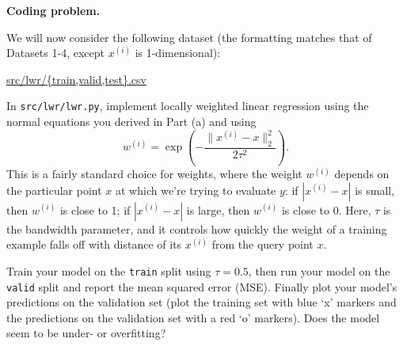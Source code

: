 \item {} \textbf{Coding problem.}

We will now consider the following dataset (the
formatting matches that of Datasets 1-4, except $x^{(i)}$ is 1-dimensional):
\begin{center}
	\url{src/lwr/{train,valid,test}.csv}	
\end{center}

In \texttt{src/lwr/lwr.py}, implement locally weighted linear regression
using the normal equations you derived in Part (a) and using
%
\begin{equation*}
	w^{(i)} = \exp\left(-\frac{\|x^{(i)} - x\|_2^2}{2\tau^2}\right).
\end{equation*}
%
This is a fairly standard choice for weights, where the weight $w^{(i)}$ depends on the particular point $x$ at which we're trying to evaluate $y$:  if $|x^{(i)} - x|$ is small, then $w^{(i)}$ is close to 1; if $|x^{(i)} - x|$ is large, then $w^{(i)}$ is close to 0. Here, $\tau$ is the bandwidth parameter, and it controls how quickly the weight of a training example falls off with distance of its $x^{(i)}$ from the query point $x$.

Train your model on the \texttt{train} split using $\tau = 0.5$, then run your
model on the \texttt{valid} split and report the mean squared error (MSE).
Finally plot your model's predictions on the validation set (plot the
training set with blue `x' markers and the predictions on the
validation set with a red `o' markers). Does the model seem to be under-
or overfitting?

